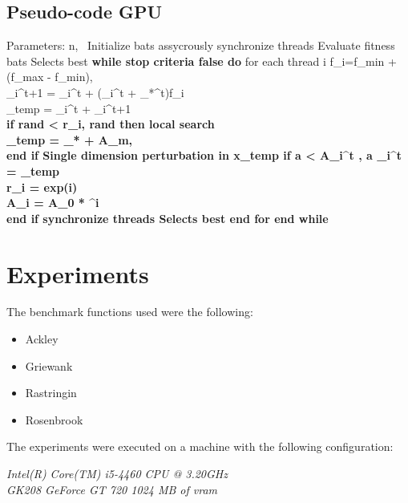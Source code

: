 \documentclass[conference]{IEEEtran}
\begin{document}
\subsection{Pseudo-code GPU}
\begin{algorithmic}
\label{Pseudo Code}
\STATE Parameters: n, \alpha\, \lambda
\STATE Initialize bats assycrously
\STATE synchronize threads
\STATE Evaluate fitness bats
\STATE Selects best
\STATE \textbf{while stop criteria false \textbf{do}}
    \STATE for each thread  i 
        f_i=f_{min} + (f_{max} - f_{min})\beta, \in \beta [0,1]\\
        _i^{t+1} = _i^{t} + (_i^{t} + _*^{t})f_i\\
        _{temp} = _i^{t} + _i^{t+1}\\
        \STATE \bf if  rand < r_i, rand \in [0,1] \textbf{then} {local search}\\
            _{temp} = _* + \epsilon A_m, \epsilon \in [-1, 1]\\
        \STATE \bf end if
        \STATE Single dimension perturbation in x_{temp}
        \STATE \bf if a < A_i^t , a \in [0,1]
        _i^t = _{temp}\\
        r_i = exp(\lambda * i)\\
        A_i =  A_{0} * \alpha^i\\
        \STATE \bf end if
        \STATE synchronize threads
        \STATE Selects best
    \STATE \bf end for
\STATE \bf end while
\end{algorithmic}

\section{Experiments}

The benchmark functions used were the following:

\begin{itemize}
    \item Ackley
    \item Griewank
    \item Rastringin
    \item Rosenbrook
\end{itemize}

The experiments were executed on a machine with the following configuration:

\textit{Intel(R) Core(TM) i5-4460  CPU @ 3.20GHz \\ GK208 GeForce GT 720 1024 MB of vram}
\end{document}
